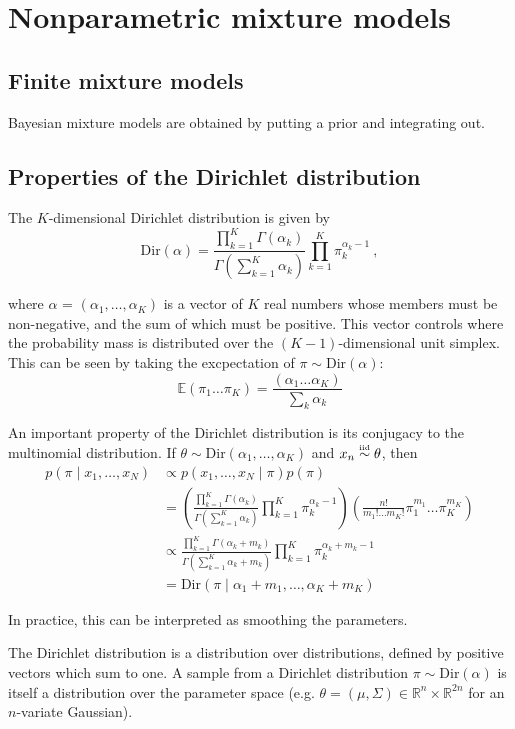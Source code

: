\documentclass[twoside]{article}
\newcommand{\Dir}{\mathrm{Dir}}
\newcommand\iid{\mathrel{\stackrel{\makebox[0pt]{\mbox{\normalfont\tiny iid}}}{\sim}}}
\begin{document}
\section{Nonparametric mixture models}
\subsection{Finite mixture models}
Bayesian mixture models are obtained by putting a prior and integrating out.

\subsection{Properties of the Dirichlet distribution}
The $K$-dimensional Dirichlet distribution is given by
\[
\Dir(\alpha) = \frac{\prod_{k=1}^{K} \Gamma{(\alpha_k)}}{\Gamma{(\sum_{k=1}^{K} \alpha_k)}} \prod_{k=1}^{K} \pi_{k}^{\alpha_k - 1} \:,
\]

where $\alpha$ = $(\alpha_1, \dots, \alpha_K)$ is a vector of $K$ real numbers whose members must be non-negative, and the sum of which must be positive.  This vector controls where the probability mass is distributed over the $(K-1)$-dimensional unit simplex.  This can be seen by taking the excpectation of $\pi \sim \Dir(\alpha)$:
$$ \mathbb{E}(\pi_1 \dots \pi_K) = \frac{(\alpha_1 \dots \alpha_K)}{\sum_k \alpha_k} $$ 

An important property of the Dirichlet distribution is its conjugacy to the multinomial distribution. If $\theta \sim \Dir(\alpha_1,\ldots,\alpha_K)$ and $x_n \iid \theta$, then
\begin{align}
  p(\pi \mid x_1, \dots, x_N)
  &\propto p(x_1, \dots, x_N \mid \pi) p(\pi) \\
  &= \left( \frac{\prod_{k=1}^{K} \Gamma{(\alpha_k)}}{\Gamma{(\sum_{k=1}^{K} \alpha_k)}} \prod_{k=1}^{K} \pi_{k}^{\alpha_k - 1} \right) \left( \frac{n!}{m_1! \ldots m_K!} \pi_1^{m_1} \ldots \pi_K^{m_K} \right) \\
  &\propto \frac{\prod_{k=1}^{K} \Gamma{(\alpha_k + m_k)}}{\Gamma{(\sum_{k=1}^{K} \alpha_k + m_k)}} \prod_{k=1}^{K} \pi_{k}^{\alpha_k + m_k - 1} \\
  &= \Dir(\pi \mid \alpha_1 + m_1, \dots, \alpha_K + m_K)
\end{align}
 
In practice, this can be interpreted as smoothing the parameters.

The Dirichlet distribution is a distribution over distributions, defined by positive vectors which sum to one. A sample from a Dirichlet distribution $\pi \sim \Dir(\alpha)$ is itself a distribution over the parameter space (e.g. $\theta = (\mu, \Sigma) \in \mathbb{R}^n \times \mathbb{R}^{2n}$ for an $n$-variate Gaussian).
\end{document}
